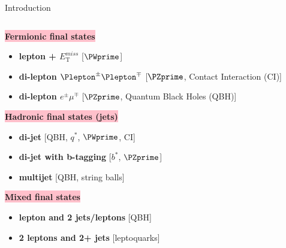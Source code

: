 \documentclass[8pt]{beamer}
\begin{document}
\begin{frame}{\large \large Introduction}
\begin{columns}
\begin{column}{6cm}
      
   \noindent\colorbox{pink}{
	\textbf{Fermionic final states}
    }\par
   \begin{itemize}
    \item {\bf lepton + $E_\mathrm{T}^{miss}$} [$\PWprime$]
    \item {\bf di-lepton $\Plepton^{\pm}\Plepton^{\mp}$} [$\PZprime$, Contact Interaction (CI)]
    \item {\bf di-lepton $e^{\pm}\mu^{\mp}$} [$\PZprime$, Quantum Black Holes (QBH)]
   \end{itemize}
   \vspace{0.5cm}
   \noindent\colorbox{pink}{
	\textbf{Hadronic final states (jets)}
    }\par
   \begin{itemize}
    \item {\bf di-jet} [QBH, $q^{*}$, $\PWprime$, CI]
    \item {\bf di-jet with b-tagging} [$b^{*}$, $\PZprime$]
    \item {\bf multijet} [QBH, string balls]
   \end{itemize}
   \vspace{0.5cm}
   \noindent\colorbox{pink}{
	\textbf{Mixed final states}
    }\par
    \begin{itemize}
    \item {\bf lepton and 2 jets/leptons} [QBH]
    \item {\bf 2 leptons and 2+ jets} [leptoquarks]
   \end{itemize}
    
  \end{column}
 \end{columns}
 
\end{frame}
\end{document}
